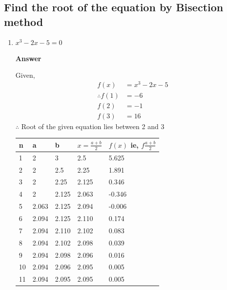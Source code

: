 \documentclass[11pt, a4paper, oneside]{book}
\begin{document}
              \subsection{Find the root of the equation by Bisection method}
              \begin{enumerate}
              \item $x^3-2x-5=0$

              \textbf{Answer}

              Given,
              \begin{align*}
              f(x)&=x^3-2x-5\\
              \therefore f(1)&=-6\\
              f(2)&=-1\\
              f(3)&=16
              \end{align*}
              $\therefore$ Root of the given equation lies between 2 and 3

              \Large
             \begin{center}
            \begin{tabular}{|l|l|l|l|l|}
            \hline
              n  & a     & b     & $x=\frac{a+b}{2}$ & $f(x)$ ie, $f\frac{a+b}{2}$ \\ \hline
              1  & 2     & 3     & 2.5               & 5.625                       \\ \hline
              2  & 2     & 2.5   & 2.25              & 1.891                       \\ \hline
              3  & 2     & 2.25  & 2.125             & 0.346                       \\ \hline
              4  & 2     & 2.125 & 2.063             & -0.346                      \\ \hline
              5  & 2.063 & 2.125 & 2.094             & -0.006                      \\ \hline
              6  & 2.094 & 2.125 & 2.110             & 0.174                       \\ \hline
              7  & 2.094 & 2.110 & 2.102             & 0.083                       \\ \hline
              8  & 2.094 & 2.102 & 2.098             & 0.039                       \\ \hline
              9  & 2.094 & 2.098 & 2.096             & 0.016                       \\ \hline
              10 & 2.094 & 2.096 & 2.095             & 0.005                       \\ \hline
              11 & 2.094 & 2.095 & 2.095             & 0.005                       \\ \hline
            \end{tabular}
            \end{center}
            \normalsize


\end{enumerate}
\end{document}
